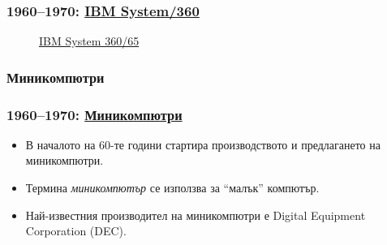 \documentclass[ignorenonframetext, hyperref=unicode]{beamer}
\begin{document}
\begin{frame}
\frametitle{1960--1970: \href{http://en.wikipedia.org/wiki/System/360}{IBM
System/360}} 
\begin{figure}
\center
{}
\caption{\href{http://www.cs.newcastle.ac.uk/events/anniversaries/40th/images/ibm360_672/index.html}{IBM System 360/65}}
\end{figure}
\end{frame}


\subsubsection{Миникомпютри}

\begin{frame}
\frametitle{1960--1970: \href{http://en.wikipedia.org/wiki/Minicomputer}{Миникомпютри}}
\begin{itemize}
  \item В началото на 60-те години стартира производството и предлагането на
  миникомпютри. 
  \item Термина {\em миникомпютър} се използва за ``малък'' компютър.
  \item Най-известния производител на миникомпютри е Digital Equipment
  Corporation (DEC).
\end{itemize}
\end{frame}
\end{document}
